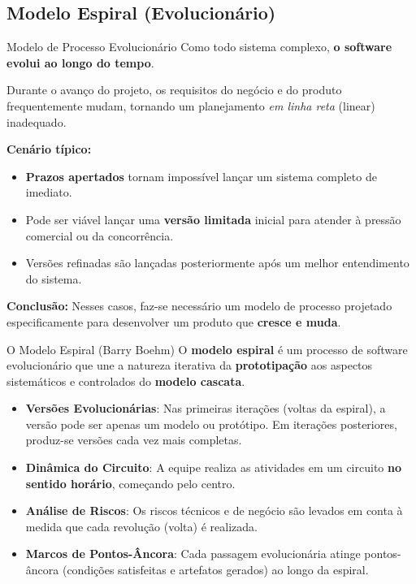 \documentclass[9pt]{beamer}
\begin{document}
\subsection{Modelo Espiral (Evolucionário)}
\begin{frame}{Modelo de Processo Evolucionário}
  Como todo sistema complexo, \textbf{o software evolui ao longo do tempo}. 
  
  \vspace{0.3cm}
  Durante o avanço do projeto, os requisitos do negócio e do produto frequentemente mudam, tornando um planejamento \textit{em linha reta} (linear) inadequado.

  \vspace{0.3cm}
  \textbf{Cenário típico:}
  \begin{itemize}
    \item \textbf{Prazos apertados} tornam impossível lançar um sistema completo de imediato.
    \item Pode ser viável lançar uma \textbf{versão limitada} inicial para atender à pressão comercial ou da concorrência.
    \item Versões refinadas são lançadas posteriormente após um melhor entendimento do sistema.
  \end{itemize}

  \vspace{0.4cm}
  \colorbox{blue!10}{
    \parbox{0.92\textwidth}{
      \scriptsize
      \textbf{Conclusão:} Nesses casos, faz-se necessário um modelo de processo projetado especificamente para desenvolver um produto que \textbf{cresce e muda}.
    }
  }
\end{frame}

\begin{frame}{O Modelo Espiral (Barry Boehm)}
  O \textbf{modelo espiral} é um processo de software evolucionário que une a natureza iterativa da \textbf{prototipação} aos aspectos sistemáticos e controlados do \textbf{modelo cascata}.

  \vspace{0.3cm}
  \begin{itemize}
    \item \textbf{Versões Evolucionárias}: Nas primeiras iterações (voltas da espiral), a versão pode ser apenas um modelo ou protótipo. Em iterações posteriores, produz-se versões cada vez mais completas.
    \item \textbf{Dinâmica do Circuito}: A equipe realiza as atividades em um circuito \textbf{no sentido horário}, começando pelo centro.
    \item \textbf{Análise de Riscos}: Os riscos técnicos e de negócio são levados em conta à medida que cada revolução (volta) é realizada.
    \item \textbf{Marcos de Pontos-Âncora}: Cada passagem evolucionária atinge pontos-âncora (condições satisfeitas e artefatos gerados) ao longo da espiral.
  \end{itemize}
\end{frame}
\end{document}
